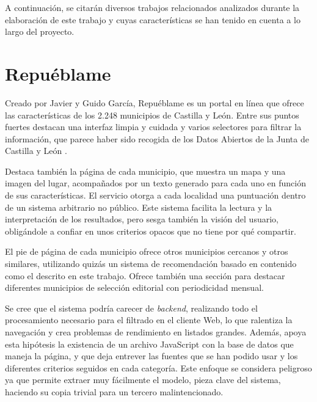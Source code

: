 
A continuación, se citarán diversos trabajos relacionados analizados durante la elaboración de este trabajo y cuyas características se han tenido en cuenta a lo largo del proyecto.

\section{Repuéblame}

Creado por Javier y Guido García, Repuéblame \cite{repueblame} es un portal en línea que ofrece las características de los 2.248 municipios de Castilla y León. Entre sus puntos fuertes destacan una interfaz limpia y cuidada y varios selectores para filtrar la información, que parece haber sido recogida de los Datos Abiertos de la Junta de Castilla y León \cite{datos_abiertos_jcyl}.


Destaca también la página de cada municipio, que muestra un mapa y una imagen del lugar, acompañados por un texto generado para cada uno en función de sus características. El servicio otorga a cada localidad una puntuación dentro de un sistema arbitrario no público. Este sistema facilita la lectura y la interpretación de los resultados, pero sesga también la visión del usuario, obligándole a confiar en unos criterios opacos que no tiene por qué compartir.


El pie de página de cada municipio ofrece otros municipios cercanos y otros similares, utilizando quizás un sistema de recomendación basado en contenido como el descrito en este trabajo. Ofrece también una sección para destacar diferentes municipios de selección editorial con periodicidad mensual.


Se cree que el sistema podría carecer de \textit{backend}, realizando todo el procesamiento necesario para el filtrado en el cliente Web, lo que ralentiza la navegación y crea problemas de rendimiento en listados grandes. Además, apoya esta hipótesis la existencia de un archivo JavaScript con la base de datos que maneja la página, y que deja entrever las fuentes que se han podido usar y los diferentes criterios seguidos en cada categoría. Este enfoque se considera peligroso ya que permite extraer muy fácilmente el modelo, pieza clave del sistema, haciendo su copia trivial para un tercero malintencionado.

